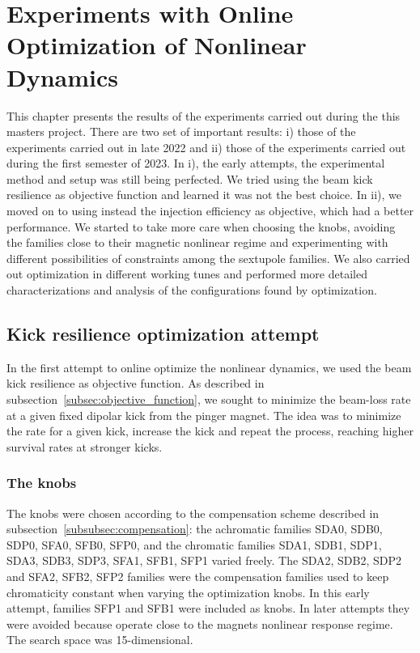 \chapter{Experiments with Online Optimization of Nonlinear Dynamics}
This chapter presents the results of the experiments carried out during the this masters project. There are two set of important results: i) those of the experiments carried out in late 2022 and ii) those of the experiments carried out during the first semester of 2023. In i), the early attempts, the experimental method and setup was still being perfected. We tried using the beam kick resilience as objective function and learned it was not the best choice. In ii), we moved on to using instead the injection efficiency as objective, which had a better performance.  We started to take more care when choosing the knobs, avoiding the families close to their magnetic nonlinear regime and experimenting with different possibilities of constraints among the sextupole families. We also carried out optimization in different working tunes and performed more detailed characterizations and analysis of the configurations found by optimization.
\section{Kick resilience optimization attempt}
\label{sec:kick_res_opt}
In the first attempt to online optimize the nonlinear dynamics, we used the beam kick resilience as objective function. As described in subsection~\ref{subsec:objective_function}, we sought to minimize the beam-loss rate at a given fixed dipolar kick from the pinger magnet. The idea was to minimize the rate for a given kick, increase the kick and repeat the process, reaching higher survival rates at stronger kicks.
\subsection{The knobs}
The knobs were chosen according to the compensation scheme described in subsection~\ref{subsubsec:compensation}: the achromatic families SDA0, SDB0, SDP0, SFA0, SFB0, SFP0, and the chromatic families SDA1, SDB1, SDP1, SDA3, SDB3, SDP3, SFA1, SFB1, SFP1 varied freely. The SDA2, SDB2, SDP2 and SFA2, SFB2, SFP2 families were the compensation families used to keep chromaticity constant when varying the optimization knobs. In this early attempt, families SFP1 and SFB1 were included as knobs. In later attempts they were avoided because operate close to the magnets nonlinear response regime. The search space was 15-dimensional.
